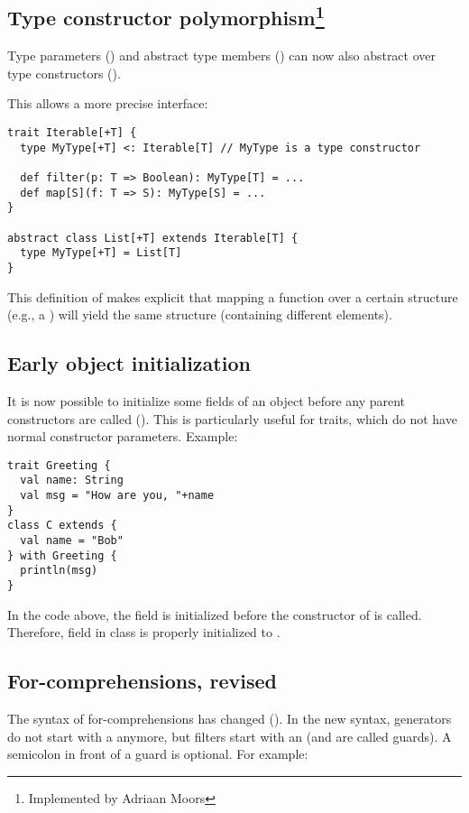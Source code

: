 \subsection*{Type constructor polymorphism\footnote{Implemented by Adriaan Moors}}
Type parameters () and abstract type members () can now also abstract over type constructors ().

This allows a more precise \lstinline@Iterable@ interface:
\begin{lstlisting}
trait Iterable[+T] {
  type MyType[+T] <: Iterable[T] // MyType is a type constructor

  def filter(p: T => Boolean): MyType[T] = ...
  def map[S](f: T => S): MyType[S] = ...
}

abstract class List[+T] extends Iterable[T] {
  type MyType[+T] = List[T]
}
\end{lstlisting}

This definition of \lstinline@Iterable@ makes explicit that mapping a function
 over a certain structure (e.g., a \lstinline@List@) will yield the same structure (containing different elements).

\subsection*{Early object initialization}

It is now possible to initialize some fields of an object before any
parent constructors are called (). This is particularly useful for
traits, which do not have normal constructor parameters. Example:
\begin{lstlisting}
trait Greeting {
  val name: String
  val msg = "How are you, "+name
}
class C extends {
  val name = "Bob"
} with Greeting {
  println(msg)
}
\end{lstlisting}
In the code above, the field  is initialized before the
constructor of  is called. Therefore, field \lstinline@msg@ in
class  is properly initialized to .

\subsection*{For-comprehensions, revised}

The syntax of for-comprehensions has changed
(). In the new syntax, generators do not
start with a  anymore, but filters start with an 
(and are called guards). A semicolon in front of a guard is optional.
For example:

